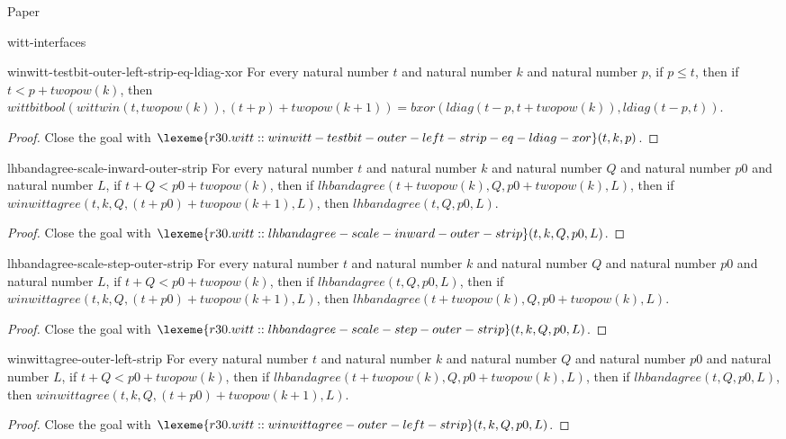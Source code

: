 \begin{lexlean}{Paper}
\begin{section}{witt-interfaces}
  \begin{theorem}{winwitt-testbit-outer-left-strip-eq-ldiag-xor}
  For every natural number \(t\) and natural number \(k\) and natural number \(p\), if \(p ≤ t\), then if \(t < p + twopow(k)\), then \(wittbitbool(wittwin(t, twopow(k)), (t + p) + twopow(k + 1)) = bxor(ldiag(t - p, t + twopow(k)), ldiag(t - p, t))\).
  \begin{proof}
  Close the goal with \(\lexeme{r30.witt::winwitt-testbit-outer-left-strip-eq-ldiag-xor}(t, k, p)\).
  \end{proof}
  \end{theorem}

  \begin{theorem}{lhbandagree-scale-inward-outer-strip}
  For every natural number \(t\) and natural number \(k\) and natural number \(Q\) and natural number \(p0\) and natural number \(L\), if \(t + Q < p0 + twopow(k)\), then if \(lhbandagree(t + twopow(k), Q, p0 + twopow(k), L)\), then if \(winwittagree(t, k, Q, (t + p0) + twopow(k + 1), L)\), then \(lhbandagree(t, Q, p0, L)\).
  \begin{proof}
  Close the goal with \(\lexeme{r30.witt::lhbandagree-scale-inward-outer-strip}(t, k, Q, p0, L)\).
  \end{proof}
  \end{theorem}

  \begin{theorem}{lhbandagree-scale-step-outer-strip}
  For every natural number \(t\) and natural number \(k\) and natural number \(Q\) and natural number \(p0\) and natural number \(L\), if \(t + Q < p0 + twopow(k)\), then if \(lhbandagree(t, Q, p0, L)\), then if \(winwittagree(t, k, Q, (t + p0) + twopow(k + 1), L)\), then \(lhbandagree(t + twopow(k), Q, p0 + twopow(k), L)\).
  \begin{proof}
  Close the goal with \(\lexeme{r30.witt::lhbandagree-scale-step-outer-strip}(t, k, Q, p0, L)\).
  \end{proof}
  \end{theorem}

  \begin{theorem}{winwittagree-outer-left-strip}
  For every natural number \(t\) and natural number \(k\) and natural number \(Q\) and natural number \(p0\) and natural number \(L\), if \(t + Q < p0 + twopow(k)\), then if \(lhbandagree(t + twopow(k), Q, p0 + twopow(k), L)\), then if \(lhbandagree(t, Q, p0, L)\), then \(winwittagree(t, k, Q, (t + p0) + twopow(k + 1), L)\).
  \begin{proof}
  Close the goal with \(\lexeme{r30.witt::winwittagree-outer-left-strip}(t, k, Q, p0, L)\).
  \end{proof}
  \end{theorem}


\end{section}
\end{lexlean}
